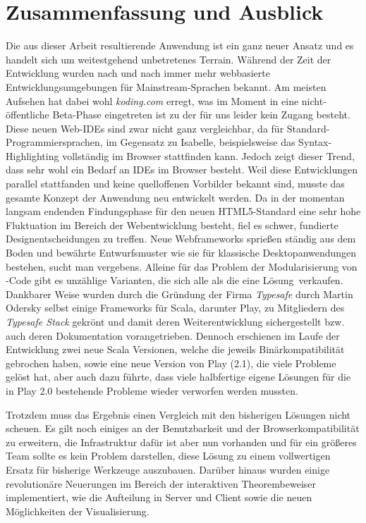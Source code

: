 \chapter{Zusammenfassung und Ausblick}

Die aus dieser Arbeit resultierende Anwendung ist ein ganz neuer Ansatz und es handelt sich um
weitestgehend unbetretenes Terrain. Während der Zeit der Entwicklung wurden nach und nach immer mehr
webbasierte Entwicklungsumgebungen für Mainstream-Sprachen bekannt. Am meisten Aufsehen hat dabei
wohl \textit{koding.com} erregt, was im Moment in eine nicht-öffentliche Beta-Phase eingetreten ist
zu der für uns leider kein Zugang besteht. Diese neuen Web-IDEs sind zwar nicht ganz vergleichbar,
da für Standard-Programmiersprachen, im Gegensatz zu Isabelle, beispielsweise das Syntax-
Highlighting vollständig im Browser stattfinden kann. Jedoch zeigt dieser Trend, dass sehr wohl ein
Bedarf an IDEs im Browser besteht. Weil diese Entwicklungen parallel stattfanden und keine
quelloffenen Vorbilder bekannt sind, musste das gesamte Konzept der Anwendung neu entwickelt werden.
Da in der momentan langsam endenden Findungsphase für den neuen HTML5-Standard eine sehr hohe
Fluktuation im Bereich der Webentwicklung besteht, fiel es schwer, fundierte Designentscheidungen zu
treffen. Neue Webframeworks sprießen ständig aus dem Boden und bewährte Entwurfsmuster wie sie für
klassische Desktopanwendungen bestehen, sucht man vergebens. Alleine für das Problem der
Modularisierung von -Code gibt es unzählige Varianten, die sich alle als \glqq die eine
Lösung\grqq\ verkaufen. Dankbarer Weise wurden durch die Gründung der Firma \textit{Typesafe} durch
Martin Odersky selbst einige Frameworks für Scala, darunter Play, zu Mitgliedern des
\textit{Typesafe Stack} gekrönt und damit deren Weiterentwicklung sichergestellt bzw. auch deren
Dokumentation vorangetrieben. Dennoch erschienen im Laufe der Entwicklung zwei neue Scala Versionen,
welche die jeweils Binärkompatibilität gebrochen haben, sowie eine neue Version von Play (2.1), die
viele Probleme gelöst hat, aber auch dazu führte, dass viele halbfertige eigene Lösungen für
die in Play 2.0 bestehende Probleme wieder verworfen werden mussten.

Trotzdem muss das Ergebnis einen Vergleich mit den bisherigen Lösungen nicht scheuen. Es gilt noch
einiges an der Benutzbarkeit und der Browserkompatibilität zu erweitern, die Infrastruktur dafür ist
aber nun vorhanden und für ein größeres Team sollte es kein Problem darstellen, diese Lösung zu
einem vollwertigen Ersatz für bisherige Werkzeuge auszubauen. Darüber hinaus wurden einige
revolutionäre Neuerungen im Bereich der interaktiven Theorembeweiser implementiert, wie die
Aufteilung in Server und Client sowie die neuen Möglichkeiten der Visualisierung.

